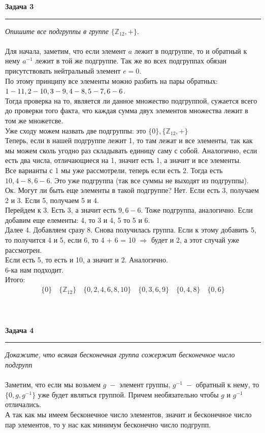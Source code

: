 \documentclass[a4paper,11pt]{article}
\begin{document}
\textbf{\large Задача 3}
\medskip\hrule\medskip
\textit{Опишите все подгруппы в группе $ \{\mathbb{Z}_{12}, +\} $}. \\ \\
Для начала, заметим, что если элемент $ a $ лежит в подгруппе, то и обратный к нему $ a^{-1} $ лежит в той же подгруппе. Так же во всех подгруппах обязан присутствовать нейтральный элемент $ e = 0 $. \\[2pt]  
По этому принципу все элементы можно разбить на пары обратных: $ 1 - 11, 2 - 10, 3 - 9, 4 - 8, \\ 5 - 7, 6 - 6$. \\[2pt] 
Тогда проверка на то, является ли данное множество подгруппой, сужается всего до проверки того факта, что каждая сумма двух элементов множества лежит в том же множетсве. \\[2pt]
Уже сходу можем назвать две подгруппы: это $ \{0\},  \{\mathbb{Z}_{12}, +\}$   \\[2pt]
Теперь, если в нашей подгруппе лежит 1, то там лежат и все элементы, так как мы можем сколь угодно раз складывать единицу саму с собой. Аналогично, если есть два числа, отличающиеся на 1, значит есть 1, а значит и все элементы. \\[2pt]
Все варианты с 1 мы уже рассмотрели, теперь если есть 2. Тогда есть $ 10, 4 - 8, 6 - 6 $. Это уже подгруппа (так все суммы не выходят из подгруппы). Ок. Могут ли быть еще элементы в такой подгруппе?
Нет. Если есть 3, получаем 2 и 3. Если 5, получаем 5 и 4. \\[2pt]
Перейдем к 3. Есть 3, а значит есть $ 9, 6 - 6 $. Тоже подгруппа, аналогично. Если добавим еще елементы: 4, то 3 и 4, 5 то 5 и 6. \\[2pt]
Далее 4. Добавляем сразу 8. Снова получилась группа. Если к этому добавить 5, то получится 4 и 5, если 6, то 4 + 6 = 10 $ \Rightarrow $ будет и 2, а этот случай уже рассмотрен. \\[2pt]
Если есть 5, то есть и 10, а значит и 2. Аналогично. \\[2pt]
6-ка нам подходит. \\[2pt]
Итого: 
\begin{gather*}
\{0\} \quad \{\mathbb{Z}_{12}\} \quad \{0, 2, 4, 6, 8, 10\} \quad \{0, 3, 6, 9\} \quad 
\{0, 4, 8\} \quad \{0, 6\}	
\end{gather*}  \\ \\ \\



\textbf{\large Задача 4}
\medskip\hrule\medskip
\textit{Докажите, что всякая бесконечная группа сожержит бесконечное число подгрупп} \\ \\
Заметим, что если мы возьмем $ g \; -$ элемент группы, $ g^{-1} \; -$ обратный к нему, то $ \{0, g, g^{-1}\} $ уже будет являться группой. Причем необязательно чтобы $ g $ и $ g^{-1} $ отличались. \\[2pt]
А так как мы имеем бесконечное число элементов, значит и бесконечное число пар элементов, то у нас как минимум бесконечно число подгрупп.
\end{document}
